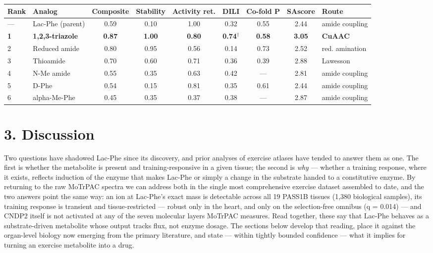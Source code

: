 \documentclass[11pt]{article}
\begin{document}
{\footnotesize\setlength{\tabcolsep}{4pt}
\begin{longtable}{llccccccl}
\toprule
\textbf{Rank} & \textbf{Analog} & \textbf{Composite} & \textbf{Stability} & \textbf{Activity ret.} & \textbf{DILI} & \textbf{Co-fold P} & \textbf{SAscore} & \textbf{Route} \\
\midrule\endhead
--- & Lac-Phe (parent) & 0.59 & 0.10 & 1.00 & 0.32 & 0.55 & 2.44 & amide coupling \\
\textbf{1} & \textbf{1,2,3-triazole} & \textbf{0.87} & \textbf{1.00} & \textbf{0.80} & \textbf{0.74$^\dagger$} & \textbf{0.58} & \textbf{3.05} & \textbf{CuAAC} \\
2 & Reduced amide & 0.80 & 0.95 & 0.56 & 0.14 & 0.73 & 2.52 & red. amination \\
3 & Thioamide & 0.70 & 0.60 & 0.71 & 0.36 & 0.39 & 2.88 & Lawesson \\
4 & N-Me amide & 0.55 & 0.35 & 0.63 & 0.42 & --- & 2.81 & amide coupling \\
5 & D-Phe & 0.54 & 0.15 & 0.81 & 0.35 & 0.61 & 2.44 & amide coupling \\
6 & alpha-Me-Phe & 0.45 & 0.35 & 0.37 & 0.38 & --- & 2.87 & amide coupling \\
\bottomrule
\end{longtable}
}

\section*{3. Discussion}

Two questions have shadowed Lac-Phe since its discovery, and prior analyses of exercise
atlases have tended to answer them as one. The first is whether the metabolite is present
and training-responsive in a given tissue; the second is \textit{why} --- whether a training
response, where it exists, reflects induction of the enzyme that makes Lac-Phe or simply a
change in the substrate handed to a constitutive enzyme. By returning to the raw MoTrPAC
spectra we can address both in the single most comprehensive exercise dataset assembled to
date, and the two answers point the same way: an ion at Lac-Phe's exact mass is detectable
across all 19 PASS1B tissues (1,380 biological samples), its training response is transient
and tissue-restricted --- robust only in the heart, and only on the selection-free omnibus
(q = 0.014) --- and CNDP2 itself is not activated at any of the seven molecular layers
MoTrPAC measures. Read together, these say that Lac-Phe behaves as a substrate-driven
metabolite whose output tracks flux, not enzyme dosage. The sections below develop that
reading, place it against the organ-level biology now emerging from the primary literature,
and state --- within tightly bounded confidence --- what it implies for turning an
exercise metabolite into a drug.
\end{document}
